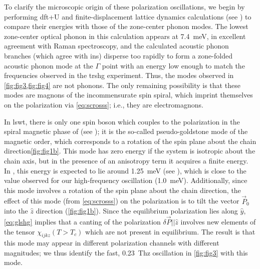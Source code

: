 To clarify the microscopic origin of these polarization oscillations, we begin by performing \gls{dft}+U and finite-displacement lattice dynamics calculations\cite{} (see ) to compare their energies with those of the zone-center phonon modes.
The lowest zone-center optical phonon in this calculation appears at \qty{7.4}{meV}, in excellent agreement with Raman spectroscopy\cite{wang_observation_2017}, and the calculated acoustic phonon branches (which agree with \gls{ins}\cite{wang_observation_2017}) disperse too rapidly to form a zone-folded acoustic phonon mode at the $\Gamma$ point with an energy low enough to match the frequencies observed in the \gls{trshg} experiment.
Thus, the modes observed in \cref{fig:fig3,fig:fig4} are not phonons.
The only remaining possibility is that these modes are magnons of the incommensurate spin spiral, which imprint themselves on the polarization via \cref{eq:scrosss}; i.e., they are electromagnons.

In \gls{lswt}, there is only one spin boson which couples to the polarization in the spiral magnetic phase of  (see ); it is the so-called pseudo-goldstone mode of the magnetic order\cite{katsura_dynamical_2007}, which corresponds to a rotation of the spin plane about the chain direction\cref{fig:fig1b}.
This mode has zero energy if the system is isotropic about the chain axis, but in the presence of an anisotropy term it acquires a finite energy.
In , this energy is expected to lie around \qty{1.25}{meV} (see ), which is close to the value observed for our high-frequency oscillation (\qty{1.0}{meV}).
Additionally, since this mode involves a rotation of the spin plane about the chain direction, the effect of this mode (from \cref{eq:scrosss}) on the polarization is to tilt the vector $\vec{P}_0$ into the $\hat{z}$ direction (\cref{fig:fig1b}).
Since the equilibrium polarization lies along $\hat{y}$, \cref{eq:glshg} implies that a canting of the polarization $\delta \vec{P} || \hat{z}$ involves new elements of the tensor $\chi_{ijkz}(T>T_c)$ which are not present in equilibrium.
The result is that this mode may appear in different polarization channels with different magnitudes; we thus identify the fast, \qty{0.23}{Thz} oscillation in \cref{fig:fig3} with this mode.

